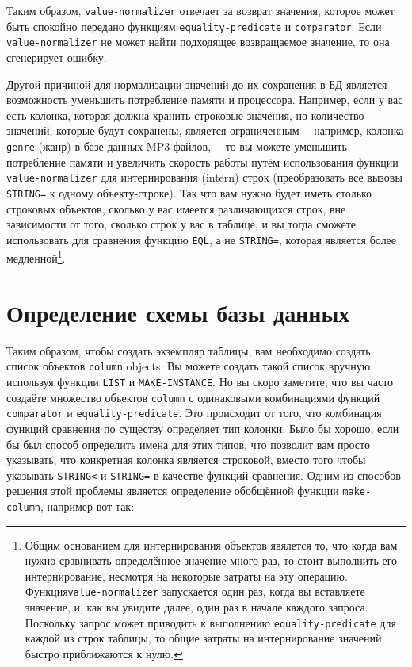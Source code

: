 Таким образом, \lstinline{value-normalizer} отвечает за возврат значения, которое может быть
спокойно передано функциям \lstinline{equality-predicate} и \lstinline{comparator}.  Если
\lstinline{value-normalizer} не может найти подходящее возвращаемое значение, то она
сгенерирует ошибку.

Другой причиной для нормализации значений до их сохранения в БД является возможность
уменьшить потребление памяти и процессора.  Например, если у вас есть колонка, которая
должна хранить строковые значения, но количество значений, которые будут сохранены,
является ограниченным~-- например, колонка \lstinline{genre} (жанр) в базе данных
MP3-файлов,~-- то вы можете уменьшить потребление памяти и увеличить скорость работы путём
использования функции \lstinline{value-normalizer} для интернирования (intern) строк
(преобразовать все вызовы \lstinline{STRING=} к одному объекту-строке).  Так что вам нужно
будет иметь столько строковых объектов, сколько у вас имеется различающихся строк, вне
зависимости от того, сколько строк у вас в таблице, и вы тогда сможете использовать для
сравнения функцию \lstinline{EQL}, а не \lstinline{STRING=}, которая является более
медленной\footnote{Общим основанием для интернирования объектов явялется то, что когда вам
  нужно сравнивать определённое значение много раз, то стоит выполнить его интернирование,
  несмотря на некоторые затраты на эту операцию.  Функция\lstinline{value-normalizer}
  запускается один раз, когда вы вставляете значение, и, как вы увидите далее, один раз в
  начале каждого запроса. Поскольку запрос может приводить к выполнению
  \lstinline{equality-predicate} для каждой из строк таблицы, то общие затраты на
  интернирование значений быстро приближаются к нулю.}\hspace{\footnotenegspace}.

\section{Определение схемы базы данных}

Таким образом, чтобы создать экземпляр таблицы, вам необходимо создать список объектов
\lstinline{column} objects.  Вы можете создать такой список вручную, используя функции
\lstinline{LIST} и \lstinline{MAKE-INSTANCE}.  Но вы скоро заметите, что вы часто создаёте множество
объектов \lstinline{column} с одинаковыми комбинациями функций \lstinline{comparator} и
\lstinline{equality-predicate}. Это происходит от того, что комбинация функций сравнения по
существу определяет тип колонки. Было бы хорошо, если бы был способ определить имена для
этих типов, что позволит вам просто указывать, что конкретная колонка является строковой,
вместо того чтобы указывать \lstinline{STRING<} и \lstinline{STRING=} в качестве функций сравнения.
Одним из способов решения этой проблемы является определение обобщённой функции
\lstinline{make-column}, например вот так:

